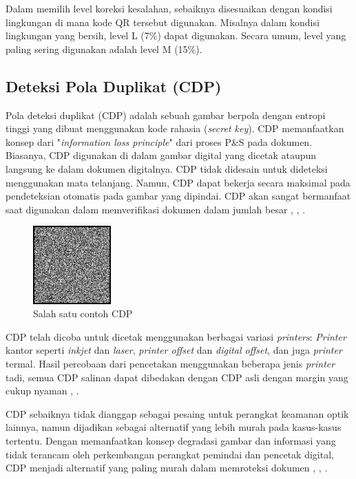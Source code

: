 Dalam memilih level koreksi kesalahan, sebaiknya disesuaikan dengan kondisi lingkungan di mana kode QR tersebut digunakan. Misalnya dalam kondisi lingkungan yang bersih, level L (7\%) dapat digunakan. Secara umum, level yang paling sering digunakan adalah level M (15\%).

\subsection{Deteksi Pola Duplikat (CDP)}
Pola deteksi duplikat (CDP) adalah sebuah gambar berpola dengan entropi tinggi yang dibuat menggunakan kode rahasia (\emph{secret key}). CDP memanfaatkan konsep dari "\emph{information loss principle}" dari proses P\&S pada dokumen. Biasanya, CDP digunakan di dalam gambar digital yang dicetak ataupun langsung ke dalam dokumen digitalnya. CDP tidak didesain untuk dideteksi menggunakan mata telanjang. Namun, CDP dapat bekerja secara maksimal pada pendeteksian otomatis pada gambar yang dipindai. CDP akan sangat bermanfaat saat digunakan dalam memverifikasi dokumen dalam jumlah besar \cite{picard2004digital}, \cite{picard2004towards}, \cite{}.

\begin{figure}[h]
	\centering
	\includegraphics[width=3cm]{contents/chapter-2/2-contohcdp.jpg}
	\caption{Salah satu contoh CDP}
	\label{Fig: 2-contohcdp}
\end{figure}

CDP telah dicoba untuk dicetak menggunakan berbagai variasi \emph{printers}: \emph{Printer} kantor seperti \emph{inkjet} dan \emph{laser}, \emph{printer offset} dan \emph{digital offset}, dan juga \emph{printer} termal. Hasil percobaan dari pencetakan menggunakan beberapa jenis \emph{printer} tadi, semua CDP salinan dapat dibedakan dengan CDP asli dengan margin yang cukup nyaman \cite{picard2004digital}, \cite{picard2004towards}.

CDP sebaiknya tidak dianggap sebagai pesaing untuk perangkat keamanan optik lainnya, namun dijadikan sebagai alternatif yang lebih murah pada kasus-kasus tertentu. Dengan memanfaatkan konsep degradasi gambar dan informasi yang tidak terancam oleh perkembangan perangkat pemindai dan pencetak digital, CDP menjadi alternatif yang paling murah dalam memroteksi dokumen \cite{picard2004digital}, \cite{picard2004towards}, \cite{harwood1998optical}.

